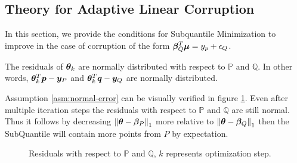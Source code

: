 \documentclass{article} %
\newcommand{\norm}[1]{\left\lVert#1\right\rVert}
\begin{document}
\begin{appendices}
	\section{Theory for Adaptive Linear Corruption}
	In this section, we provide the conditions for Subquantile Minimization to improve in the case of corruption of the form $\displaystyle {\bm{\beta}}_Q^T {\bm{\mu}} = y_p + {\epsilon}_Q$.
	\begin{assumption}\label{asm:normal-error}
		The residuals of ${\bm{\theta}}_k$ are normally distributed with respect to $\mathbb{P}$ and $\mathbb{Q}$. In other words, ${\bm{\theta}}_k^T {\bm{p}} - {\bm{y}}_P$ and ${\bm{\theta}}_k^T {\bm{q}} - {\bm{y}}_Q$ are normally distributed.
	\end{assumption}
	Assumption \ref{asm:normal-error} can be visually verified in figure \ref{fig:normal-residual}. Even after multiple iteration steps the residuals with respect to $\mathbb{P}$ and $\mathbb{Q}$ are still normal. Thus it follows by decreasing $\norm{\vtheta - \vbeta_P}_1$ more relative to $\norm{\vtheta - \vbeta_Q}_1$ then the SubQuantile will contain more points from $P$ by expectation. 
	\begin{figure}
		\begin{minipage}[htbp]{0.24\textwidth}
			\centering
			
			\label{fig:1}
		\end{minipage}
		\hfill
		\begin{minipage}[htbp]{0.24\textwidth}
			\centering
			
			\label{fig:2}
		\end{minipage}
		\hfill
		\begin{minipage}[htbp]{0.24\textwidth}
			\centering
			
			\label{fig:3}
		\end{minipage}
		\hfill
		\begin{minipage}[htbp]{0.24\textwidth}
			\centering
			
			\label{fig:4}
		\end{minipage}
		\caption{Residuals with respect to $\mathbb{P}$ and $\mathbb{Q}$, $k$ represents optimization step.}
		\label{fig:normal-residual}
	\end{figure}


\end{appendices}
\end{document}
